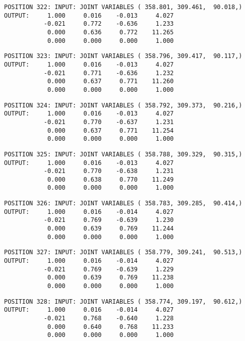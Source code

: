 \begin{verbatim}
POSITION 322: INPUT: JOINT VARIABLES ( 358.801, 309.461,  90.018,)
OUTPUT:     1.000     0.016    -0.013     4.027
           -0.021     0.772    -0.636     1.233
            0.000     0.636     0.772    11.265
            0.000     0.000     0.000     1.000
\end{verbatim} \pagebreak[1]\begin{verbatim}
POSITION 323: INPUT: JOINT VARIABLES ( 358.796, 309.417,  90.117,)
OUTPUT:     1.000     0.016    -0.013     4.027
           -0.021     0.771    -0.636     1.232
            0.000     0.637     0.771    11.260
            0.000     0.000     0.000     1.000
\end{verbatim} \pagebreak[1]\begin{verbatim}
POSITION 324: INPUT: JOINT VARIABLES ( 358.792, 309.373,  90.216,)
OUTPUT:     1.000     0.016    -0.013     4.027
           -0.021     0.770    -0.637     1.231
            0.000     0.637     0.771    11.254
            0.000     0.000     0.000     1.000
\end{verbatim} \pagebreak[1]\begin{verbatim}
POSITION 325: INPUT: JOINT VARIABLES ( 358.788, 309.329,  90.315,)
OUTPUT:     1.000     0.016    -0.013     4.027
           -0.021     0.770    -0.638     1.231
            0.000     0.638     0.770    11.249
            0.000     0.000     0.000     1.000
\end{verbatim} \pagebreak[1]\begin{verbatim}
POSITION 326: INPUT: JOINT VARIABLES ( 358.783, 309.285,  90.414,)
OUTPUT:     1.000     0.016    -0.014     4.027
           -0.021     0.769    -0.639     1.230
            0.000     0.639     0.769    11.244
            0.000     0.000     0.000     1.000
\end{verbatim} \pagebreak[1]\begin{verbatim}
POSITION 327: INPUT: JOINT VARIABLES ( 358.779, 309.241,  90.513,)
OUTPUT:     1.000     0.016    -0.014     4.027
           -0.021     0.769    -0.639     1.229
            0.000     0.639     0.769    11.238
            0.000     0.000     0.000     1.000
\end{verbatim} \pagebreak[1]\begin{verbatim}
POSITION 328: INPUT: JOINT VARIABLES ( 358.774, 309.197,  90.612,)
OUTPUT:     1.000     0.016    -0.014     4.027
           -0.021     0.768    -0.640     1.228
            0.000     0.640     0.768    11.233
            0.000     0.000     0.000     1.000
\end{verbatim} \pagebreak[1]\begin{verbatim}

\end{verbatim}
